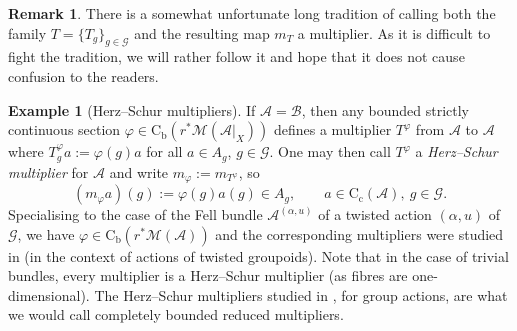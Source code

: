 \documentclass[11 pt, leqno]{amsart}
\numberwithin{equation}{section}
\theoremstyle{plain}
\theoremstyle{definition}
\newtheorem {rem} [thm]{Remark}
\newtheorem{ex}[thm]{Example}
\newcommand*{\contc}{\mathrm{C_c}}%
\newcommand*{\contb}{\mathrm{C_b}}%
\newcommand{\B}{\mathcal B}
\newcommand{\M}{\mathcal M}
\newcommand{\m}{m}
\newcommand{\G}{\mathcal G} %
\newcommand{\A}{\mathcal A}
\newcommand*{\gcomment}[1]{{\color{Green}#1}}
\begin{document}
\begin{rem}\label{rmk:confusion}
There is a somewhat unfortunate long tradition of calling both the family $T=\{T_g\}_{g\in \G}$ and the resulting map $m_T$ a multiplier. 
As it is difficult to fight the tradition, we will rather follow it and hope that it does not cause confusion to the readers.
\end{rem}

\begin{ex}[Herz--Schur multipliers] %
If $\A = \B$, then any bounded strictly continuous section $\varphi\in \contb(r^*\M(\A|_{X}))$ defines a multiplier $T^{\varphi}$ from $\A$ to $\A$ where $T^\varphi_g a := \varphi(g) a$ for all $a\in A_{g}$, $g\in \G$. 
One may then call $T^{\varphi}$ a \emph{Herz--Schur multiplier} for $\A$ and write $\m_{\varphi} := \m_{T^{\varphi}}$, so
\begin{equation}\label{eq:Herz-Schur_multiplier_map_defn}
	(\m_{\varphi}a)(g) := \varphi(g)a(g)\in A_{g}, \qquad a\in \contc(\A),\ g\in \G.
\end{equation}
Specialising to the case of the Fell bundle $\A^{(\alpha,u)}$ of a twisted action $(\alpha,u)$ of $\G$, we have $\varphi\in \contb(r^*\M(\A))$ and the corresponding multipliers were  studied in \cite{BartoszKangAdam} (in the context of actions of twisted groupoids). 
Note that in the case of trivial bundles, every multiplier is a Herz--Schur multiplier (as fibres are one-dimensional).
The Herz--Schur multipliers studied in \cite{mtt}, \cite{mstt} for group actions, are what we would call completely bounded reduced multipliers. 
\end{ex}
\end{document}

